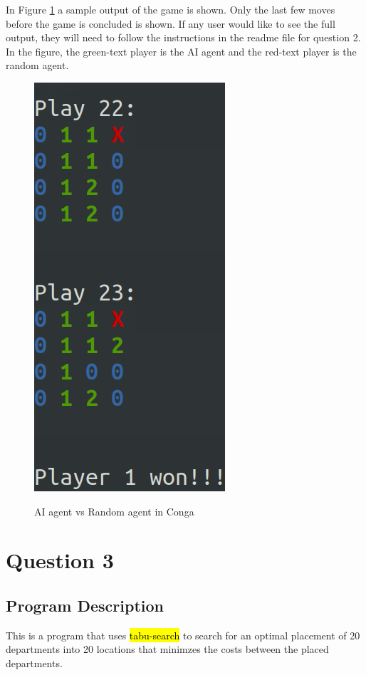 \documentclass{article}
\begin{document}
In Figure \ref{fig:q2} a sample output of the game is shown. Only the last few moves before the game is concluded is shown. If any user would like to see the full output, they will need to follow the instructions in the readme file for question 2. In the figure, the green-text player is the AI agent and the red-text player is the random agent.
\begin{figure}
    \centering
    {\label{fig:q2}\includegraphics[scale=0.5]{q2.png}}
    \caption{AI agent vs Random agent in Conga}
\end{figure}

\newpage
\section{Question 3}

\subsection{Program Description}

This is a program that uses \hl{tabu-search} to search for an optimal placement of 20 departments into 20 locations that minimzes the costs between the placed departments.
\end{document}
